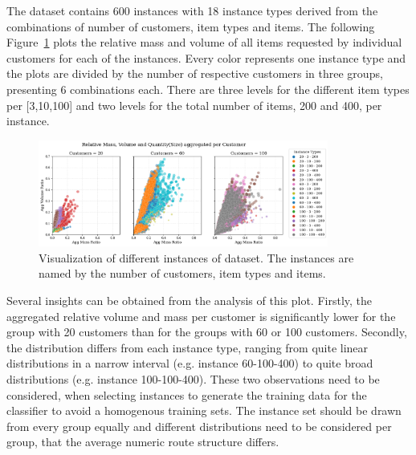 The dataset contains 600 instances with 18 instance types derived from the combinations
of number of customers, item types and items. The following Figure~\ref{fig:krebs_dataset_analysis_detailes} plots
the relative mass and volume of all items requested by individual customers for each of the instances. Every color
represents one instance type and the plots are divided by the number of respective customers in three groups, presenting
6 combinations each. There are three levels for the different item types per [3,10,100] and two levels for the total
number of items, 200 and 400, per instance.
\begin{figure}[ht]
	\centering
	\includegraphics[width=0.85\textwidth]{pictures/krebs_instances_detailed.png}
	\caption[Visualization of different instances of \textcite{krebs_advanced_2021} dataset.]{Visualization of different instances of \krebsADataSetText dataset.
		The instances are named by the number of customers, item types and items.}
	\label{fig:krebs_dataset_analysis_detailes}
\end{figure}%
Several insights can be obtained from the analysis of this plot. Firstly, the aggregated relative
volume and mass per customer is significantly lower for the group with 20 customers than for the groups with 60 or 100 customers.
Secondly, the distribution differs from each instance type, ranging from quite linear distributions in a narrow
interval (e.g. instance 60-100-400) to quite broad distributions (e.g. instance 100-100-400). These two observations need to be considered,
when selecting instances to generate the training data for the classifier to avoid a homogenous training sets.
The instance set should be drawn from every group equally and different distributions need to be considered per group,
that the average numeric route structure differs.

\subsubsection{\gendreauDataSetText}

